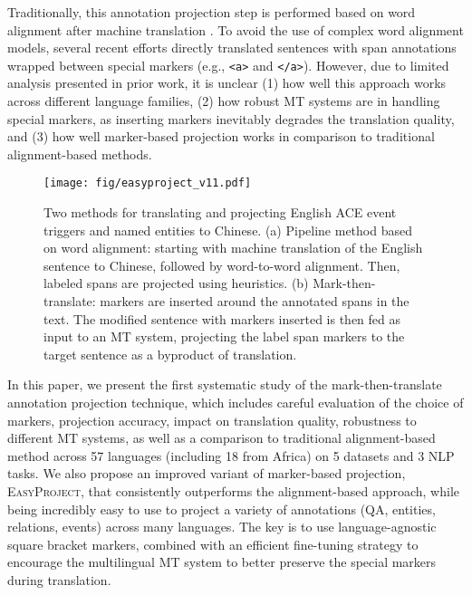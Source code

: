 \documentclass[11pt,dvipsnames]{article}
\begin{document}
 
Traditionally, this annotation projection step is performed based on word alignment after machine translation \cite{akbik2015generating, aminian-etal-2019-cross}. To avoid the use of complex word alignment models, several recent efforts \cite{lewis2020mlqa, hu2020xtreme} directly translated sentences with span annotations wrapped between special markers (e.g., {\tt <a>} and {\tt </a>}). However, due to limited analysis presented in prior work, it is unclear (1) how well this approach works across different language families,  (2) how robust  MT systems are in handling special markers, as inserting  markers inevitably degrades the translation quality,   and (3) how well marker-based projection works in comparison to traditional alignment-based methods.























\begin{figure*}[ht!]
    \centering
    \vspace{-5pt}
\texttt{[image: fig/easyproject\_v11.pdf]}
    \vspace{-6.5pt}
    \caption{Two methods for translating and projecting English ACE event triggers and named entities to Chinese. (a) Pipeline method based on  word alignment: starting with machine translation of the English sentence to Chinese, followed by word-to-word alignment. Then, labeled spans are projected using heuristics. (b) Mark-then-translate: markers are inserted around the  annotated spans in the text. The modified sentence with markers inserted is then fed as input to an MT system, projecting the label span markers to the target sentence as a byproduct of translation.}
\label{fig:EasyProject}
\vspace{-15.5pt}
\end{figure*}




In this paper, we present the first systematic study of the mark-then-translate annotation projection technique,  which includes careful evaluation of the choice of markers, projection accuracy, impact on translation quality, robustness to different MT systems, as well as a comparison to traditional alignment-based method across 57 languages (including 18 from Africa)   on 5 datasets and 3 NLP tasks. We also propose an improved variant of marker-based projection, \textsc{EasyProject}, that consistently outperforms the alignment-based approach, while being incredibly easy to use to project a variety of annotations (QA, entities, relations, events) across many languages. The key is to use language-agnostic square bracket markers, combined with an efficient fine-tuning strategy to encourage the multilingual MT system to better preserve the  special markers during  translation.
\end{document}
